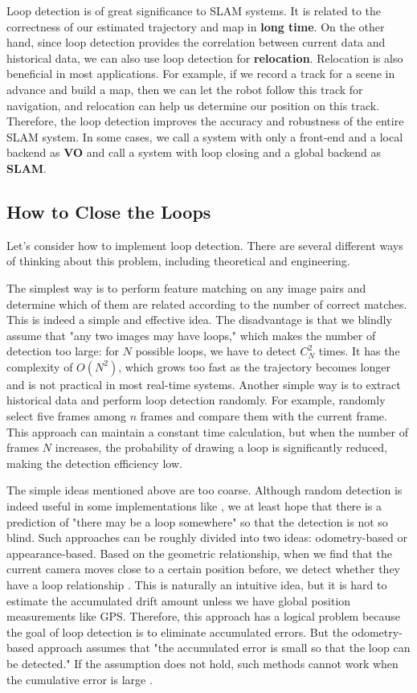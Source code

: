 Loop detection is of great significance to SLAM systems. It is related to the correctness of our estimated trajectory and map in \textbf{long time}. On the other hand, since loop detection provides the correlation between current data and historical data, we can also use loop detection for \textbf{relocation}. Relocation is also beneficial in most applications. For example, if we record a track for a scene in advance and build a map, then we can let the robot follow this track for navigation, and relocation can help us determine our position on this track. Therefore, the loop detection improves the accuracy and robustness of the entire SLAM system. In some cases, we call a system with only a front-end and a local backend as \textbf{VO} and call a system with loop closing and a global backend as \textbf{SLAM}.

\subsection{How to Close the Loops}
Let's consider how to implement loop detection. There are several different ways of thinking about this problem, including theoretical and engineering.

The simplest way is to perform feature matching on any image pairs and determine which of them are related according to the number of correct matches. This is indeed a simple and effective idea. The disadvantage is that we blindly assume that "any two images may have loops," which makes the number of detection too large: for $N$ possible loops, we have to detect $C_N^2$ times. It has the complexity of $O(N^2)$, which grows too fast as the trajectory becomes longer and is not practical in most real-time systems. Another simple way is to extract historical data and perform loop detection randomly. For example, randomly select five frames among $n$ frames and compare them with the current frame. This approach can maintain a constant time calculation, but when the number of frames $N$ increases, the probability of drawing a loop is significantly reduced, making the detection efficiency low.

The simple ideas mentioned above are too coarse. Although random detection is indeed useful in some implementations like {\cite{Endres2014}}, we at least hope that there is a prediction of "there may be a loop somewhere" so that the detection is not so blind. Such approaches can be roughly divided into two ideas: odometry-based or appearance-based. Based on the geometric relationship, when we find that the current camera moves close to a certain position before, we detect whether they have a loop relationship \cite{Hahnel2003}. This is naturally an intuitive idea, but it is hard to estimate the accumulated drift amount unless we have global position measurements like GPS. Therefore, this approach has a logical problem because the goal of loop detection is to eliminate accumulated errors. But the odometry-based approach assumes that "the accumulated error is small so that the loop can be detected." If the assumption does not hold, such methods cannot work when the cumulative error is large \cite{Beeson2010}.

